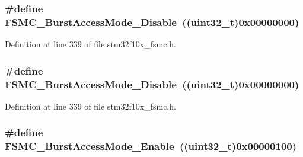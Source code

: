 \subsubsection[{\texorpdfstring{F\+S\+M\+C\+\_\+\+Burst\+Access\+Mode\+\_\+\+Disable}{FSMC_BurstAccessMode_Disable}}]{\setlength{\rightskip}{0pt plus 5cm}\#define F\+S\+M\+C\+\_\+\+Burst\+Access\+Mode\+\_\+\+Disable~(({\bf uint32\+\_\+t})0x00000000)}\hypertarget{group___f_s_m_c___burst___access___mode_ga26fc544945415e350563a9b00684850c}{}\label{group___f_s_m_c___burst___access___mode_ga26fc544945415e350563a9b00684850c}


Definition at line 339 of file stm32f10x\+\_\+fsmc.\+h.

\subsubsection[{\texorpdfstring{F\+S\+M\+C\+\_\+\+Burst\+Access\+Mode\+\_\+\+Disable}{FSMC_BurstAccessMode_Disable}}]{\setlength{\rightskip}{0pt plus 5cm}\#define F\+S\+M\+C\+\_\+\+Burst\+Access\+Mode\+\_\+\+Disable~(({\bf uint32\+\_\+t})0x00000000)}\hypertarget{group___f_s_m_c___burst___access___mode_ga26fc544945415e350563a9b00684850c}{}\label{group___f_s_m_c___burst___access___mode_ga26fc544945415e350563a9b00684850c}


Definition at line 339 of file stm32f10x\+\_\+fsmc.\+h.

\subsubsection[{\texorpdfstring{F\+S\+M\+C\+\_\+\+Burst\+Access\+Mode\+\_\+\+Enable}{FSMC_BurstAccessMode_Enable}}]{\setlength{\rightskip}{0pt plus 5cm}\#define F\+S\+M\+C\+\_\+\+Burst\+Access\+Mode\+\_\+\+Enable~(({\bf uint32\+\_\+t})0x00000100)}\hypertarget{group___f_s_m_c___burst___access___mode_ga841831dfacfdd8889dafe26cc594bf02}{}\label{group___f_s_m_c___burst___access___mode_ga841831dfacfdd8889dafe26cc594bf02}


